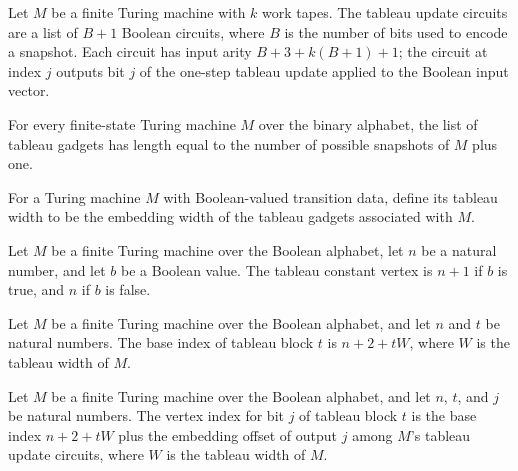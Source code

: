 \begin{definition}
\label{Complexity.tableauGadgets}
\leanok
{}
Let $M$ be a finite Turing machine with $k$ work tapes. The tableau update circuits are
a list of $B+1$ Boolean circuits, where $B$ is the number of bits used to encode a
snapshot. Each circuit has input arity $B+3+k(B+1)+1$; the circuit at index $j$ outputs
bit $j$ of the one-step tableau update applied to the Boolean input vector.
\end{definition}

\begin{theorem}
\label{Complexity.length_tableauGadgets}
\leanok
{}
For every finite-state Turing machine $M$ over the binary alphabet, the list of tableau
gadgets has length equal to the number of possible snapshots of $M$ plus one.
\end{theorem}

\begin{definition}
\label{Complexity.tableauWidth}
\leanok
{}
For a Turing machine $M$ with Boolean-valued transition data, define its tableau width
to be the embedding width of the tableau gadgets associated with $M$.
\end{definition}

\begin{definition}
\label{Complexity.tableauConst}
\leanok
Let $M$ be a finite Turing machine over the Boolean alphabet, let $n$ be a natural
number, and let $b$ be a Boolean value. The tableau constant vertex is $n+1$ if $b$ is
true, and $n$ if $b$ is false.
\end{definition}

\begin{definition}
\label{Complexity.tableauBase}
\leanok
{}
Let $M$ be a finite Turing machine over the Boolean alphabet, and let $n$ and $t$ be
natural numbers. The base index of tableau block $t$ is $n+2+tW$, where $W$ is the
tableau width of $M$.
\end{definition}

\begin{definition}
\label{Complexity.tableauVertex}
\leanok
{}
Let $M$ be a finite Turing machine over the Boolean alphabet, and let $n$, $t$, and $j$
be natural numbers. The vertex index for bit $j$ of tableau block $t$ is the base index
$n+2+tW$ plus the embedding offset of output $j$ among $M$'s tableau update circuits,
where $W$ is the tableau width of $M$.
\end{definition}

